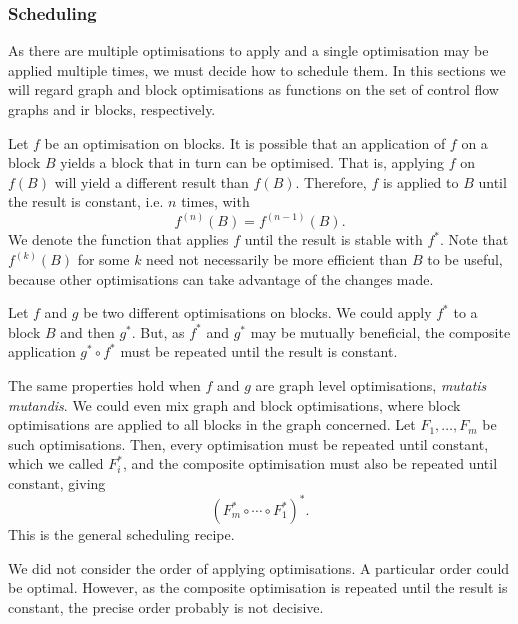 \subsubsection*{Scheduling}
As there are multiple optimisations to apply and a single optimisation may be applied multiple times, we must decide how to schedule them. In this sections we will regard graph and block optimisations as functions on the set of control flow graphs and ir blocks, respectively.

Let $f$ be an optimisation on blocks. It is possible that an application of $f$ on a block $B$ yields a block that in turn can be optimised. That is, applying $f$ on $f(B)$ will yield a different result than $f(B)$. Therefore, $f$ is applied to $B$ until the result is constant, i.e. $n$ times, with $$f^{(n)}(B) = f^{(n-1)}(B).$$ We denote the function that applies $f$ until the result is stable with $f^*$. Note that $f^{(k)}(B)$ for some $k$ need not necessarily be more efficient than $B$ to be useful, because other optimisations can take advantage of the changes made.

Let $f$ and $g$ be two different optimisations on blocks. We could apply $f^*$ to a block $B$ and then $g^*$. But, as $f^*$ and $g^*$ may be mutually beneficial, the composite application $g^* \circ f^*$ must be repeated until the result is constant.

The same properties hold when $f$ and $g$ are graph level optimisations, \emph{mutatis mutandis}. We could even mix graph and block optimisations, where block optimisations are applied to all blocks in the graph concerned. Let $F_1, \ldots, F_m$ be such optimisations. Then, every optimisation must be repeated until constant, which we called $F_i^*$, and the composite optimisation must also be repeated until constant, giving $${(F_m^* \circ \cdots \circ F_1^*)}^*.$$ This is the general scheduling recipe.

We did not consider the order of applying optimisations. A particular order could be optimal. However, as the composite optimisation is repeated until the result is constant, the precise order probably is not decisive.


